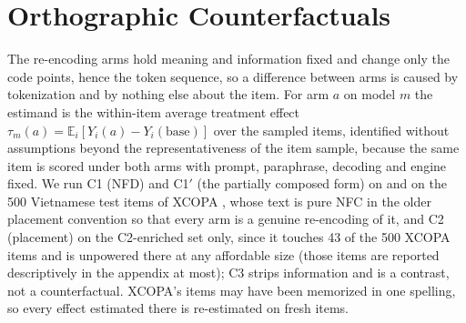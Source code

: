 \section{Orthographic Counterfactuals}
\label{sec:counterfactuals}

The re-encoding arms hold meaning and information fixed and change only the code points, hence the token sequence, so a difference between arms is caused by tokenization and by nothing else about the item. For arm $a$ on model $m$ the estimand is the within-item average treatment effect $\tau_m(a) = \mathbb{E}_i[Y_i(a) - Y_i(\mathrm{base})]$ over the sampled items, identified without assumptions beyond the representativeness of the item sample, because the same item is scored under both arms with prompt, paraphrase, decoding and engine fixed. We run C1 (NFD) and C1$'$ (the partially composed form) on \noilai{} and on the 500 Vietnamese test items of XCOPA \citep{2020-emnlp-main-185}, whose text is pure NFC in the older placement convention so that every arm is a genuine re-encoding of it, and C2 (placement) on the C2-enriched \noilai{} set only, since it touches 43 of the 500 XCOPA items and is unpowered there at any affordable size (those items are reported descriptively in the appendix at most); C3 strips information and is a contrast, not a counterfactual. XCOPA's items may have been memorized in one spelling, so every effect estimated there is re-estimated on fresh \noilai{} items.

